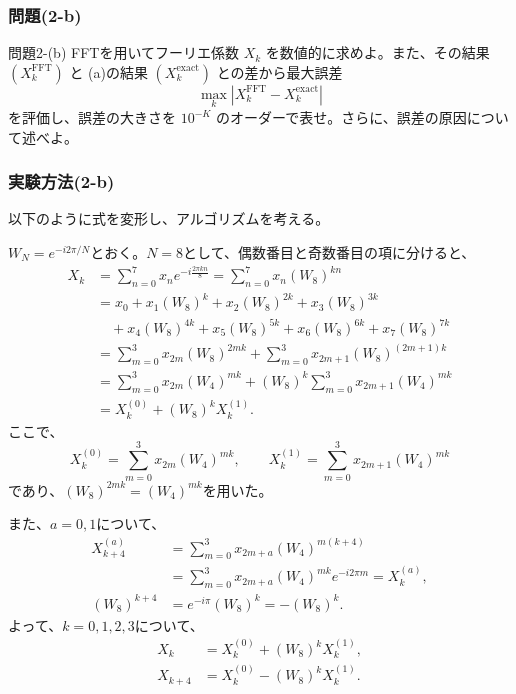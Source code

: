 \documentclass[a4j]{jarticle}
\begin{document}
\subsubsection{問題(2-b)}

\begin{itembox}[l]{問題2-(b)}
FFTを用いてフーリエ係数 $X_k$ を数値的に求めよ。また、その結果 $(X_k^{\mathrm{FFT}})$ と (a)の結果 $(X_k^{\mathrm{exact}})$ との差から最大誤差
      \[
        \max_k\left|X_k^{\mathrm{FFT}}-X_k^{\mathrm{exact}}\right|
      \]
      を評価し、誤差の大きさを $10^{-K}$ のオーダーで表せ。さらに、誤差の原因について述べよ。
\end{itembox}

\subsubsection{実験方法(2-b)}
以下のように式を変形し、アルゴリズムを考える。

$W_N=e^{-i2\pi/N}$とおく。$N=8$として、偶数番目と奇数番目の項に分けると、
\[
  \begin{aligned}
    X_k
    &=\sum_{n=0}^{7}x_n e^{-i\frac{2\pi kn}{8}}
      =\sum_{n=0}^{7}x_n(W_8)^{kn}\\
    &=x_0+x_1(W_8)^k+x_2(W_8)^{2k}+x_3(W_8)^{3k}\\
    &\quad+x_4(W_8)^{4k}+x_5(W_8)^{5k}
      +x_6(W_8)^{6k}+x_7(W_8)^{7k}\\
    &=\sum_{m=0}^{3}x_{2m}(W_8)^{2mk}
      +\sum_{m=0}^{3}x_{2m+1}(W_8)^{(2m+1)k}\\
    &=\sum_{m=0}^{3}x_{2m}(W_4)^{mk}
      +(W_8)^k\sum_{m=0}^{3}x_{2m+1}(W_4)^{mk}\\
    &=X_k^{(0)}+(W_8)^kX_k^{(1)}.
  \end{aligned}
\]
ここで、
\[
  X_k^{(0)}=\sum_{m=0}^{3}x_{2m}(W_4)^{mk},\qquad
  X_k^{(1)}=\sum_{m=0}^{3}x_{2m+1}(W_4)^{mk}
\]
であり、$(W_8)^{2mk}=(W_4)^{mk}$を用いた。

また、$a=0,1$について、
\[
  \begin{aligned}
    X_{k+4}^{(a)}
    &=\sum_{m=0}^{3}x_{2m+a}(W_4)^{m(k+4)}\\
    &=\sum_{m=0}^{3}x_{2m+a}(W_4)^{mk}e^{-i2\pi m}
      =X_k^{(a)},\\
    (W_8)^{k+4}
    &=e^{-i\pi}(W_8)^k=-(W_8)^k.
  \end{aligned}
\]
よって、$k=0,1,2,3$について、
\[
  \begin{aligned}
    X_k&=X_k^{(0)}+(W_8)^kX_k^{(1)},\\
    X_{k+4}&=X_k^{(0)}-(W_8)^kX_k^{(1)}.
  \end{aligned}
\]
\end{document}
